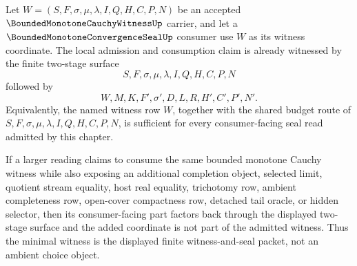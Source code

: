 \begin{theorem}
\label{thm:bounded-monotone-cauchy-witness-minimal-convergence-seal-witness}
Let $W=(S,F,\sigma,\mu,\lambda,I,Q,H,C,P,N)$ be an accepted $\BoundedMonotoneCauchyWitnessUp$ carrier, and let a $\BoundedMonotoneConvergenceSealUp$ consumer use $W$ as its witness coordinate. The local admission and consumption claim is already witnessed by the finite two-stage surface
$$
S,F,\sigma,\mu,\lambda,I,Q,H,C,P,N
$$
followed by
$$
W,M,K,F',\sigma',D,L,R,H',C',P',N'.
$$
Equivalently, the named witness row $W$, together with the shared budget route of $S,F,\sigma,\mu,\lambda,I,Q,H,C,P,N$, is sufficient for every consumer-facing seal read admitted by this chapter.

If a larger reading claims to consume the same bounded monotone Cauchy witness while also exposing an additional completion object, selected limit, quotient stream equality, host real equality, trichotomy row, ambient completeness row, open-cover compactness row, detached tail oracle, or hidden selector, then its consumer-facing part factors back through the displayed two-stage surface and the added coordinate is not part of the admitted witness. Thus the minimal witness is the displayed finite witness-and-seal packet, not an ambient choice object.
\end{theorem}
